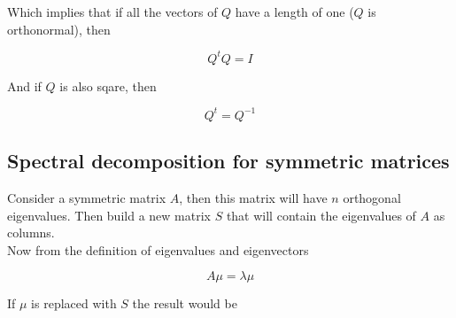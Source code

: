 \documentclass[12pt,journal]{IEEEtran}
\begin{document}
    Which implies that if all the vectors of $Q$ have a length of one ($Q$ is
    orthonormal), then

    \begin{equation*}
        Q^t Q = I
    \end{equation*}

    And if $Q$ is also sqare, then

    \begin{equation*}
        Q^t = Q^{-1}
    \end{equation*}

    \subsection{Spectral decomposition for symmetric matrices} \label{spectral_decomp}

    Consider a symmetric matrix $A$, then this matrix will have $n$ orthogonal
    eigenvalues. Then build a new matrix $S$ that will contain the eigenvalues of
    $A$ as columns.\\

    Now from the definition of eigenvalues and eigenvectors

    \begin{equation*}
        A \mu = \lambda \mu
    \end{equation*}

    If $\mu$ is replaced with $S$ the result would be
\end{document}
